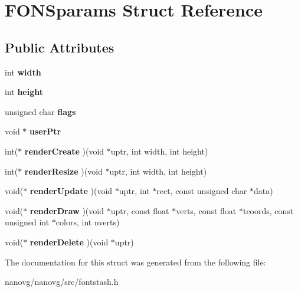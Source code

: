 \hypertarget{struct_f_o_n_sparams}{\section{F\+O\+N\+Sparams Struct Reference}
\label{struct_f_o_n_sparams}
}
\subsection*{Public Attributes}
\begin{DoxyCompactItemize}
\item 
\hypertarget{struct_f_o_n_sparams_aac83f900d8d0d99db419facda30dd9d2}{int {\bfseries width}}\label{struct_f_o_n_sparams_aac83f900d8d0d99db419facda30dd9d2}

\item 
\hypertarget{struct_f_o_n_sparams_a938b4ebdbc1734625b57f801b830758b}{int {\bfseries height}}\label{struct_f_o_n_sparams_a938b4ebdbc1734625b57f801b830758b}

\item 
\hypertarget{struct_f_o_n_sparams_a1fedd9cf05c88dc089a76e4a94f4dec0}{unsigned char {\bfseries flags}}\label{struct_f_o_n_sparams_a1fedd9cf05c88dc089a76e4a94f4dec0}

\item 
\hypertarget{struct_f_o_n_sparams_a3a6a794c1b7b473d0ac6beb232a8f1e9}{void $\ast$ {\bfseries user\+Ptr}}\label{struct_f_o_n_sparams_a3a6a794c1b7b473d0ac6beb232a8f1e9}

\item 
\hypertarget{struct_f_o_n_sparams_a92d9a5443b3694c2a698e12a41720616}{int($\ast$ {\bfseries render\+Create} )(void $\ast$uptr, int width, int height)}\label{struct_f_o_n_sparams_a92d9a5443b3694c2a698e12a41720616}

\item 
\hypertarget{struct_f_o_n_sparams_ad3fc02cf5846a215e7b23f583681e06a}{int($\ast$ {\bfseries render\+Resize} )(void $\ast$uptr, int width, int height)}\label{struct_f_o_n_sparams_ad3fc02cf5846a215e7b23f583681e06a}

\item 
\hypertarget{struct_f_o_n_sparams_aceb5385a77ddcfb142909967a0d120e7}{void($\ast$ {\bfseries render\+Update} )(void $\ast$uptr, int $\ast$rect, const unsigned char $\ast$data)}\label{struct_f_o_n_sparams_aceb5385a77ddcfb142909967a0d120e7}

\item 
\hypertarget{struct_f_o_n_sparams_ade57583dd6f18eada98763a4f1817bf9}{void($\ast$ {\bfseries render\+Draw} )(void $\ast$uptr, const float $\ast$verts, const float $\ast$tcoords, const unsigned int $\ast$colors, int nverts)}\label{struct_f_o_n_sparams_ade57583dd6f18eada98763a4f1817bf9}

\item 
\hypertarget{struct_f_o_n_sparams_ac375908ec6a8963c5893c0066df4d157}{void($\ast$ {\bfseries render\+Delete} )(void $\ast$uptr)}\label{struct_f_o_n_sparams_ac375908ec6a8963c5893c0066df4d157}

\end{DoxyCompactItemize}


The documentation for this struct was generated from the following file\+:\begin{DoxyCompactItemize}
\item 
nanovg/nanovg/src/fontstash.\+h\end{DoxyCompactItemize}
